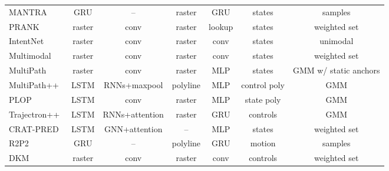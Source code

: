 \begin{table}[h!]
\begin{adjustbox}{max width=\textwidth}
\begin{tabular}{l |ccc|c|c|c}
			MANTRA~\cite{marchetti2020mantra}	& GRU	& --	& raster	& GRU	& states	& samples	\\
			PRANK~\cite{biktairov2020prank}	& raster	& conv	& raster	& lookup	& states	& weighted set	\\
			IntentNet~\cite{casas2018intentnet}	& raster	& conv	& raster	& conv	& states	& unimodal	\\
			Multimodal~\cite{cui2019multimodal}	& raster	& conv	& raster	& conv	& states	& weighted set	\\
			MultiPath~\cite{chai2019multipath}	& raster	& conv	& raster	& MLP	& states	& GMM w/ static anchors	\\
			MultiPath++~\cite{varadarajan2022multipath++}	& LSTM	& RNNs+maxpool	& polyline	& MLP	& control poly	& GMM	\\
			PLOP~\cite{buhet2021plop}	& LSTM	& conv	& raster	& MLP	& state poly	& GMM	\\
			Trajectron++\cite{salzmann2020trajectron++}	& LSTM	& RNNs+attention	& raster	& GRU	& controls	& GMM	\\
			CRAT-PRED\cite{schmidt2022crat}	& LSTM	& GNN+attention	& --	& MLP	& states	& weighted set	\\
			R2P2~\cite{rhinehart2018r2p2}	& GRU	& --	& polyline	& GRU	& motion	& samples	\\
			DKM~\cite{cui2020deep}	& raster	& conv	& raster	& conv	& controls	& weighted set	\\
			\bottomrule
		\end{tabular}
		\label{table:2_dl_related_work_mp}
	\end{adjustbox}
\end{table}

